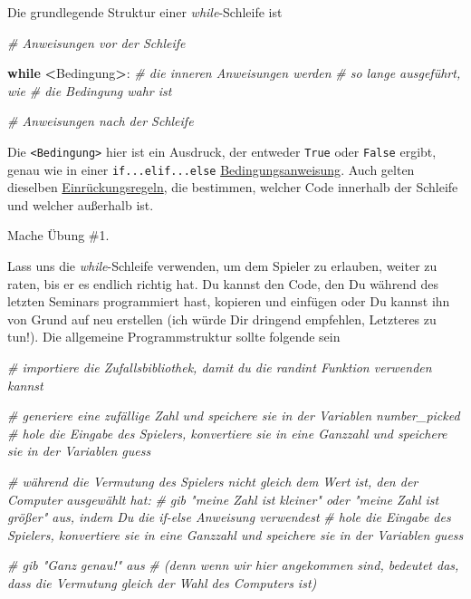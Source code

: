 \documentclass[
]{book}
\newenvironment{Shaded}{\begin{snugshade}}{\end{snugshade}}
\newcommand{\CommentTok}[1]{\textcolor[rgb]{0.56,0.35,0.01}{\textit{#1}}}
\newcommand{\ControlFlowTok}[1]{\textcolor[rgb]{0.13,0.29,0.53}{\textbf{#1}}}
\newcommand{\NormalTok}[1]{#1}
\newcommand{\OperatorTok}[1]{\textcolor[rgb]{0.81,0.36,0.00}{\textbf{#1}}}
\begin{document}
Die grundlegende Struktur einer \emph{while}-Schleife ist

\begin{Shaded}
\begin{Highlighting}[]
\CommentTok{\# Anweisungen vor der Schleife}

\ControlFlowTok{while} \OperatorTok{\textless{}}\NormalTok{Bedingung}\OperatorTok{\textgreater{}}\NormalTok{:}
    \CommentTok{\# die inneren Anweisungen werden}
    \CommentTok{\# so lange ausgeführt, wie}
    \CommentTok{\# die Bedingung wahr ist}
    
\CommentTok{\# Anweisungen nach der Schleife}
\end{Highlighting}
\end{Shaded}

Die \texttt{\textless{}Bedingung\textgreater{}} hier ist ein Ausdruck, der entweder \texttt{True} oder \texttt{False} ergibt, genau wie in einer \texttt{if...elif...else} \protect\hyperlink{comparisons}{Bedingungsanweisung}. Auch gelten dieselben \protect\hyperlink{indentation}{Einrückungsregeln}, die bestimmen, welcher Code innerhalb der Schleife und welcher außerhalb ist.

Mache Übung \#1.

Lass uns die \emph{while}-Schleife verwenden, um dem Spieler zu erlauben, weiter zu raten, bis er es endlich richtig hat. Du kannst den Code, den Du während des letzten Seminars programmiert hast, kopieren und einfügen oder Du kannst ihn von Grund auf neu erstellen (ich würde Dir dringend empfehlen, Letzteres zu tun!). Die allgemeine Programmstruktur sollte folgende sein

\begin{Shaded}
\begin{Highlighting}[]
\CommentTok{\# importiere die Zufallsbibliothek, damit du die randint Funktion verwenden kannst}

\CommentTok{\# generiere eine zufällige Zahl und speichere sie in der Variablen number\_picked}
\CommentTok{\# hole die Eingabe des Spielers, konvertiere sie in eine Ganzzahl und speichere sie in der Variablen guess}

\CommentTok{\# während die Vermutung des Spielers nicht gleich dem Wert ist, den der Computer ausgewählt hat:}
    \CommentTok{\# gib "meine Zahl ist kleiner" oder "meine Zahl ist größer" aus, indem Du die if{-}else Anweisung verwendest}
    \CommentTok{\# hole die Eingabe des Spielers, konvertiere sie in eine Ganzzahl und speichere sie in der Variablen guess}
    
\CommentTok{\# gib "Ganz genau!" aus }
\CommentTok{\# (denn wenn wir hier angekommen sind, bedeutet das, dass die Vermutung gleich der Wahl des Computers ist)}
\end{Highlighting}
\end{Shaded}
\end{document}
